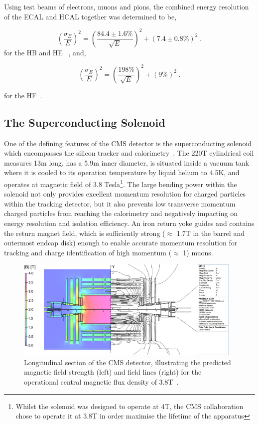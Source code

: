 Using test beams of electrons, muons and pions, the combined energy resolution of the ECAL and HCAL together was determined to be, 

\begin{equation}
(\frac{\sigma_{E}}{E})^{2} = (\frac{84.4 \pm 1.6\%}{\sqrt{E}})^{2} + (7.4 \pm 0.8\%)^{2} \;.
\label{eq:hcalResolution}
\end{equation}
for the HB and HE ~\cite{Abdullin:2008zzb}, and,

\begin{equation}
(\frac{\sigma_{E}}{E})^{2} = (\frac{198\%}{\sqrt{E}})^{2} + (9\%)^{2} \;.
\label{eq:hfResolution}
\end{equation}

for the HF~\cite{Bayatian:2006jz}.

\subsection{The Superconducting Solenoid}\label{subsec:magnet}
One of the defining features of the CMS detector is the superconducting solenoid which encompasses the silicon tracker and calorimetry~\cite{Acquistapace:1997fm,Herve:2000}.
The 220T cylindrical coil measures 13m long, has a 5.9m inner diameter, is situated inside a vacuum tank where it is cooled to its operation temperature by liquid helium to 4.5K, and operates at magnetic field of 3.8 Tesla\footnote{Whilst the solenoid was designed to operate at 4T, the CMS collaboration chose to operate it at 3.8T in order maximise the lifetime of the apparatus}.
The large bending power within the solenoid not only provides excellent momentum resolution for charged particles within the tracking detector, but it also prevents low transverse momentum charged particles from reaching the calorimetry and negatively impacting on energy resolution and isolation efficiency.
An iron return yoke guides and contains the return magnet field, which is sufficiently strong ($\approx$ 1.7T in the barrel and outermost endcap disk) enough to enable accurate momentum resolution for tracking and charge identification of high momentum ($\approx$ 1\TeVc) muons.

\begin{figure}[htbp]
\begin{center}
\includegraphics[width=0.97\textwidth]{figs/cms/cms_magnetic_field.png}
\caption{Longitudinal section of the CMS detector, illustrating the predicted magnetic field strength (left) and field lines (right) for the operational central magnetic flux density of 3.8T~\cite{Chatrchyan:2009si}.}
\label{fig:magneticField}
\end{center}
\end{figure}

